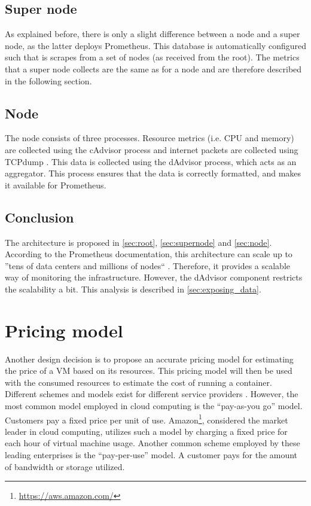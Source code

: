 \subsection{Super node} \label{sec:supernode}
As explained before, there is only a slight difference between a node and a super node, as the latter deploys Prometheus. This database is automatically configured such that is scrapes from a set of nodes (as received from the root). The metrics that a super node collects are the same as for a node and are therefore described in the following section.

\subsection{Node} \label{sec:node}
The node consists of three processes. Resource metrics (i.e. CPU and memory) are collected using the cAdvisor process and internet packets are collected using TCPdump \cite{tcpdump}. This data is collected using the dAdvisor process, which acts as an aggregator. This process ensures that the data is correctly formatted, and makes it available for Prometheus.

\subsection{Conclusion}
The architecture is proposed in \autoref{sec:root}, \autoref{sec:supernode} and \autoref{sec:node}. According to the Prometheus documentation, this architecture can scale up to ''tens of data centers and millions of nodes`` \cite{prometheus_federation}. Therefore, it provides a scalable way of monitoring the infrastructure. However, the dAdvisor component restricts the scalability a bit. This analysis is described in \autoref{sec:exposing_data}.

\section{Pricing model} \label{sec:pricing}

Another design decision is to propose an accurate pricing model for estimating the price of a VM based on its resources.
This pricing model will then be used with the consumed resources to estimate the cost of running a container.
Different schemes and models exist for different service providers \cite{bulla2014cloud}. However, the most common model employed in cloud computing is the ``pay-as-you go'' model. Customers pay a fixed price per unit of use. Amazon\footnote{\url{https://aws.amazon.com/}}, considered the market leader in cloud computing, utilizes such a model by charging a fixed price for each hour of virtual machine usage. 
Another common scheme employed by these leading enterprises is the ``pay-per-use'' model. A customer pays for the amount of bandwidth or storage utilized.\\

